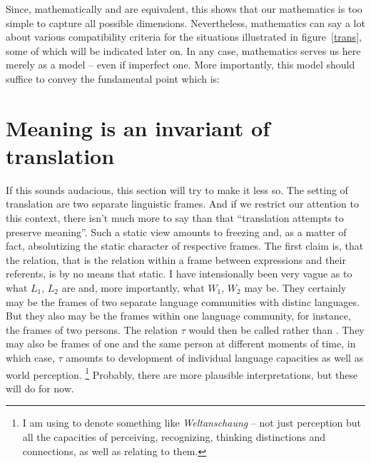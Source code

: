 \documentclass[10pt]{article}
\begin{document}
Since, mathematically  and  are 
equivalent, this shows that our mathematics is too simple to capture all 
possible dimensions. Nevertheless, mathematics can say a lot about various 
compatibility criteria for the situations illustrated in 
figure~\ref{trans}, some of which will be indicated later on. In any case, 
mathematics serves us here merely as a model -- even if imperfect one. More 
importantly, this model should suffice to convey the fundamental point 
which is:

\section{Meaning is an invariant of translation}
If this sounds audacious, this section will try to make it less so. The 
setting of translation are two separate linguistic frames. And if we restrict 
our attention to this context, there isn't much more to say than that 
``translation attempts to preserve meaning''. Such a static view amounts to 
freezing and, as a matter of fact, absolutizing the static character of 
respective frames. The first claim is, that the relation, that is the 
relation within a frame between expressions and their referents, is by no 
means that static. I have intensionally been very 
vague as to what $L_1$, $L_2$ are and, more importantly, what $W_1$, $W_2$ 
may be. They certainly may be the frames of two separate language communities 
with distinc languages. But they also may be the frames within one 
language community, for instance, the frames of two persons. The 
relation $\tau$ would then be called  rather than 
. They may also be frames of one and the same person at 
different moments of time, in which case, $\tau$ amounts to development of 
individual language capacities as well as world perception. \footnote{I am 
using  to denote something like {\em Weltanschaung} -- not 
just perception but all the 
capacities of perceiving, recognizing, thinking distinctions and 
connections, as well as relating to them.} 
Probably, there are more plausible interpretations, but 
these will do for now.
\end{document}
